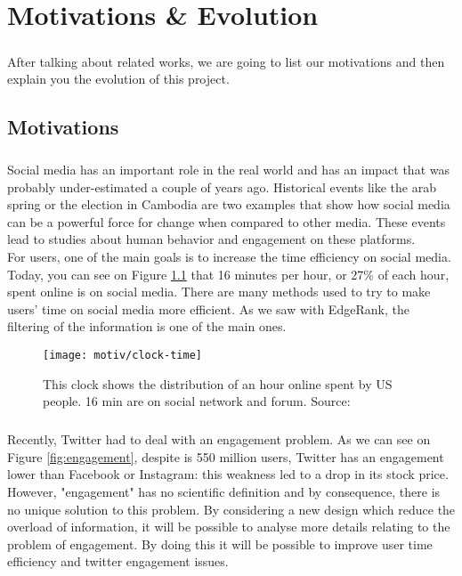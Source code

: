 \chapter{Motivations \& Evolution}

\paragraph{}
After talking about related works, we are going to list our motivations and then explain you the evolution of this project. 
\section{Motivations}
\paragraph{}
Social media has an important role in the real world and has an impact that was probably under-estimated a couple of years ago. Historical events like the arab spring or the election in Cambodia \cite{f_cambodia} are two examples that show how social media can be a powerful force for change when compared to other media. These events lead to studies about human behavior and engagement on these platforms.\\
For users, one of the main goals is to increase the time efficiency on social media. Today, you can see on Figure \ref{fig:clock} that 16 minutes per hour, or 27\% of each hour, spent online is on social media. There are many methods used to try to make users' time on social media more efficient.  As we saw with EdgeRank, the filtering of the information is one of the main ones.

\begin{figure}[h] 
\centering 
\texttt{[image: motiv/clock-time]} 
\caption[Time spent of Social Media]{This clock shows the distribution of an hour online spent by US people. 16 min are on social network and forum. Source: \cite{s_clock}}
\label{fig:clock} 
\end{figure}

\paragraph{}
Recently, Twitter had to deal with an engagement problem. As we can see on Figure \ref{fig:engagement}, despite is 550 million users, Twitter has an engagement lower than Facebook or Instagram: this weakness led to  a drop in its stock price. However, "engagement" has no scientific definition and by consequence, there is no unique solution to this problem. By considering a new design which reduce the overload of information, it will be possible to analyse more details relating to the problem of engagement. By doing this it will be possible to improve user time efficiency and twitter engagement issues. \\

